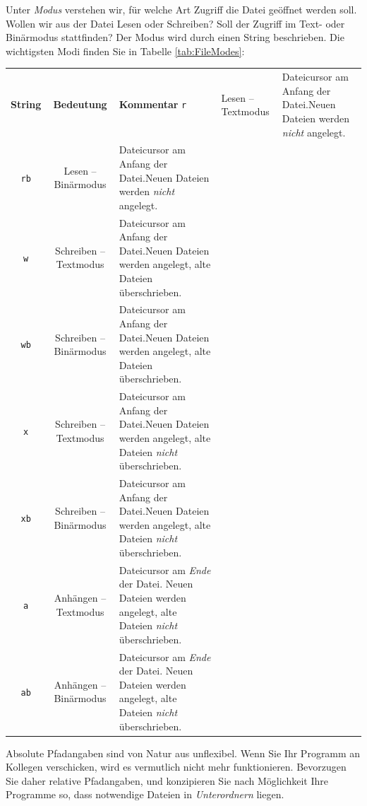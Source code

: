 Unter \emph{Modus} verstehen wir, für welche Art Zugriff die Datei geöffnet werden soll. Wollen wir aus der Datei Lesen oder Schreiben? Soll der Zugriff im Text- oder Binärmodus stattfinden? Der Modus wird durch einen String beschrieben. Die wichtigsten Modi finden Sie in Tabelle \ref{tab:FileModes}:

\begin{center}
\begin{tabular}{c|cp{.6\linewidth}}
	\toprule
	\textbf{String}	& \textbf{Bedeutung}				& \textbf{Kommentar} \tabcrlf
	\texttt{r}				& Lesen -- Textmodus				& Dateicursor am Anfang der Datei.\newline Neuen Dateien werden \emph{nicht} angelegt.\\
	\texttt{rb}			& Lesen -- Binärmodus			& Dateicursor am Anfang der Datei.\newline Neuen Dateien werden \emph{nicht} angelegt.\\
	\texttt{w}				& Schreiben -- Textmodus		& Dateicursor am Anfang der Datei.\newline Neuen Dateien werden angelegt, alte Dateien überschrieben.\\
	\texttt{wb}			& Schreiben -- Binärmodus	& Dateicursor am Anfang der Datei.\newline Neuen Dateien werden angelegt, alte Dateien überschrieben.\\
	\texttt{x}				& Schreiben -- Textmodus		& Dateicursor am Anfang der Datei.\newline Neuen Dateien werden angelegt, alte Dateien \emph{nicht} überschrieben.\\
	\texttt{xb}			& Schreiben -- Binärmodus	& Dateicursor am Anfang der Datei.\newline Neuen Dateien werden angelegt, alte Dateien \emph{nicht} überschrieben.\\
	\texttt{a}				& Anhängen -- Textmodus		& Dateicursor am \emph{Ende} der Datei. Neuen Dateien werden angelegt, alte Dateien \emph{nicht} überschrieben.\\
	\texttt{ab}			& Anhängen -- Binärmodus		& Dateicursor am \emph{Ende} der Datei. Neuen Dateien werden angelegt, alte Dateien \emph{nicht} überschrieben. \\
	\bottomrule
\end{tabular}
\label{tab:FileModes}
\end{center}

\begin{hintbox}
Absolute Pfadangaben sind von Natur aus unflexibel. Wenn Sie Ihr Programm an Kollegen verschicken, wird es vermutlich nicht mehr funktionieren. Bevorzugen Sie daher relative Pfadangaben, und konzipieren Sie nach Möglichkeit Ihre Programme so, dass notwendige Dateien in \emph{Unterordnern} liegen.
\end{hintbox}

